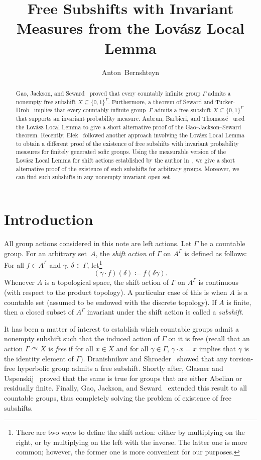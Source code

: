 \documentclass[12pt]{amsart}
\title{Free Subshifts with Invariant Measures from the Lov\'asz Local Lemma}
\date{}
\author{Anton~Bernshteyn}
\theoremstyle{definition}
\theoremstyle{remark}
\newcommand{\0}{\emptyset}
\newcommand{\set}[1]{\{#1\}}
\newcommand{\acts}{\curvearrowright}
\numberwithin{equation}{section}
\begin{document}
	
	\maketitle
	
	\begin{abstract}
		Gao, Jackson, and Seward~\cite{GJS1} proved that every countably infinite group $\Gamma$ admits a nonempty free subshift $X \subseteq \set{0,1}^\Gamma$. Furthermore, a theorem of Seward and Tucker-Drob~\cite{T-DS} implies that every countably infinite group~$\Gamma$ admits a free subshift $X \subseteq \set{0,1}^\Gamma$ that supports an invariant probability measure. Aubrun, Barbieri, and Thomass\'e~\cite{ABT} used the Lov\'asz Local Lemma to give a short alternative proof of the Gao--Jackson--Seward theorem. Recently, Elek~\cite{E} followed another approach involving the Lov\'asz Local Lemma to obtain a different proof of the existence of free subshifts with invariant probability measures for finitely generated sofic groups. Using the measurable version of the Lov\'asz Local Lemma for shift actions established by the author in~\cite{B}, we give a short alternative proof of the existence of such subshifts for arbitrary groups. Moreover, we can find such subshifts in any nonempty invariant open set.
	\end{abstract}
	
	\section{Introduction}
	
	All group actions considered in this note are left actions. Let $\Gamma$ be a countable group. For an arbitrary set~$A$, the \emph{shift action} of $\Gamma$ on $A^\Gamma$ is defined as follows: For all $f \in A^\Gamma$ and $\gamma$, $\delta \in \Gamma$, let\footnote{There are two ways to define the shift action: either by multiplying on the right, or by multiplying on
		the left with the inverse. The latter one is more common; however, the former one is more convenient for our purposes.}
	$$
		(\gamma \cdot f)(\delta) \coloneqq f(\delta \gamma).
	$$
	Whenever $A$ is a topological space, the shift action of $\Gamma$ on $A^\Gamma$ is continuous (with respect to the product topology). A particular case of this is when $A$ is a countable set (assumed to be endowed with the discrete topology). If $A$ is finite, then a closed subset of $A^\Gamma$ invariant under the shift action is called a \emph{subshift}.
	
	It has been a matter of interest to establish which countable groups admit a nonempty subshift such that the induced action of $\Gamma$ on it is free (recall that an action $\Gamma \acts X$ is \emph{free} if for all $x \in X$ and for all $\gamma \in \Gamma$, $\gamma \cdot x = x$ implies that $\gamma$ is the identity element of $\Gamma$). Dranishnikov and Shroeder~\cite{DS} showed that any torsion-free hyperbolic group admits a free subshift. Shortly after, Glasner and Uspenskij~\cite{GU} proved that the same is true for groups that are either Abelian or residually finite. Finally, Gao, Jackson, and Seward~\cite{GJS1, GJS2} extended this result to all countable groups, thus completely solving the problem of existence of free subshifts.
	
\end{document}

